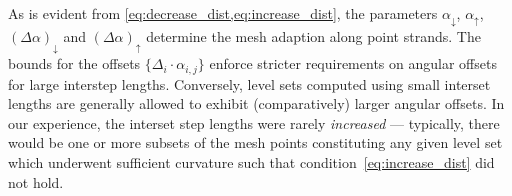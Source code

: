 

As is evident from \cref{eq:decrease_dist,eq:increase_dist}, the parameters
$\alpha_{\downarrow}$, $\alpha_{\uparrow}$, $(\Delta\alpha)_{\downarrow}$ and
$(\Delta\alpha)_{\uparrow}$ determine the mesh adaption along point strands.
The bounds for the offsets $\{\Delta_{i}\cdot\alpha_{i,j}\}$ enforce stricter
requirements on angular offsets for large interstep lengths. Conversely, level
sets computed using small interset lengths are generally allowed to exhibit
(comparatively) larger angular offsets. In our experience, the interset step
lengths were rarely \emph{increased}  --- typically, there would be one or more
subsets of the mesh points constituting any given level set which underwent
sufficient curvature such that condition~\eqref{eq:increase_dist} did not hold.
